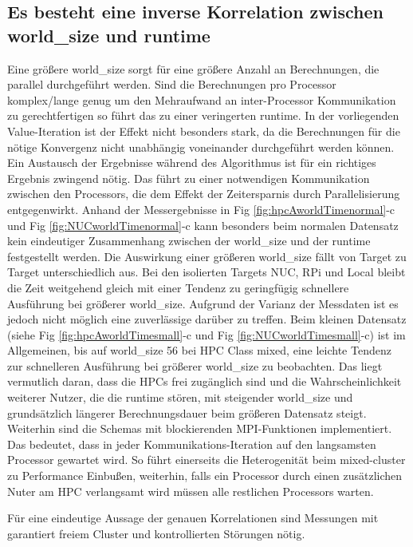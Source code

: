 \subsection{Es besteht eine inverse Korrelation zwischen world\_size und runtime}

Eine größere world\_size sorgt für eine größere Anzahl an Berechnungen, die parallel durchgeführt werden.
Sind die Berechnungen pro Processor komplex/lange genug um den Mehraufwand an inter-Processor Kommunikation zu
gerechtfertigen so führt das zu einer veringerten runtime.
In der vorliegenden Value-Iteration ist der Effekt nicht besonders stark, da die Berechnungen für die nötige
Konvergenz nicht unabhängig voneinander durchgeführt werden können. Ein Austausch der Ergebnisse während des Algorithmus ist für ein
richtiges Ergebnis zwingend nötig. Das führt zu einer notwendigen Kommunikation zwischen den Processors,
die dem Effekt der Zeitersparnis durch Parallelisierung entgegenwirkt.
Anhand der Messergebnisse in Fig \ref{fig:hpcAworldTimenormal}-c und Fig \ref{fig:NUCworldTimenormal}-c kann besonders beim normalen Datensatz
kein eindeutiger Zusammenhang zwischen der world\_size und der runtime festgestellt werden.
Die Auswirkung einer größeren world\_size fällt von Target zu Target unterschiedlich aus.
Bei den isolierten Targets NUC, RPi und Local bleibt die Zeit weitgehend gleich mit einer Tendenz zu geringfügig schnellere Ausführung
bei größerer world\_size. Aufgrund der Varianz der Messdaten ist es jedoch nicht möglich eine zuverlässige darüber zu treffen.
Beim kleinen Datensatz (siehe Fig \ref{fig:hpcAworldTimesmall}-c und Fig \ref{fig:NUCworldTimesmall}-c) ist im Allgemeinen,
bis auf world\_size 56 bei HPC Class mixed, eine leichte Tendenz zur schnelleren Ausführung bei größerer world\_size zu beobachten.
Das liegt vermutlich daran, dass die HPCs frei zugänglich sind und die Wahrscheinlichkeit weiterer Nutzer, die die runtime
stören, mit steigender world\_size und grundsätzlich längerer Berechnungsdauer beim größeren Datensatz steigt.
Weiterhin sind die Schemas mit blockierenden MPI-Funktionen implementiert. Das bedeutet, dass in jeder Kommunikations-Iteration
auf den langsamsten Processor gewartet wird. So führt einerseits die Heterogenität beim mixed-cluster zu Performance Einbußen,
weiterhin, falls ein Processor durch einen zusätzlichen Nuter am HPC verlangsamt wird müssen alle restlichen Processors warten.

Für eine eindeutige Aussage der genauen Korrelationen sind Messungen mit garantiert freiem Cluster und kontrollierten Störungen nötig.

